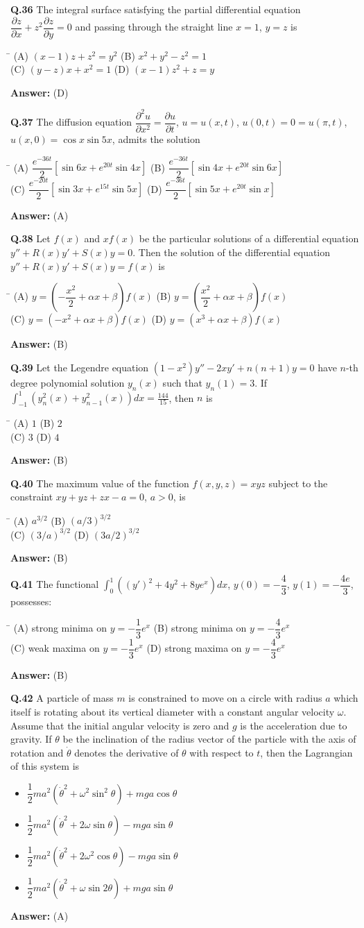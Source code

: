 \documentclass[11pt,a4paper]{article}
\newcommand{\optsfourA}[4]{%
  \begin{tabbing}
    \hspace{0.48\linewidth}\=\kill
    (A) #1 \> (B) #2 \\[2pt]
    (C) #3 \> (D) #4
  \end{tabbing}%
}
\newcommand{\optslistA}[4]{%
  \begin{itemize}
    \setlength{\itemsep}{2pt}\setlength{\parskip}{0pt}
    \item[(A)] #1
    \item[(B)] #2
    \item[(C)] #3
    \item[(D)] #4
  \end{itemize}%
}
\newcommand{\ans}[1]{\textbf{Answer:} #1\par\medskip}
\begin{document}
\textbf{Q.36} The integral surface satisfying the partial differential equation $\dfrac{\partial z}{\partial x} + z^2\dfrac{\partial z}{\partial y} = 0$ and passing through the straight line $x = 1$, $y = z$ is
\optsfourA{$(x - 1)z + z^2 = y^2$}{$x^2 + y^2 - z^2 = 1$}{$(y - z)x + x^2 = 1$}{$(x - 1)z^2 + z = y$}
\ans{(D)}

\textbf{Q.37} The diffusion equation $\dfrac{\partial^2 u}{\partial x^2} = \dfrac{\partial u}{\partial t}$, $u = u(x, t)$, $u(0, t) = 0 = u(\pi, t)$, $u(x, 0) = \cos x \sin 5x$, admits the solution
\optsfourA{$\dfrac{e^{-36t}}{2}[\sin 6x + e^{20t}\sin 4x]$}{$\dfrac{e^{-36t}}{2}[\sin 4x + e^{20t}\sin 6x]$}{$\dfrac{e^{-20t}}{2}[\sin 3x + e^{15t}\sin 5x]$}{$\dfrac{e^{-36t}}{2}[\sin 5x + e^{20t}\sin x]$}
\ans{(A)}

\textbf{Q.38} Let $f(x)$ and $x f(x)$ be the particular solutions of a differential equation $y'' + R(x)y' + S(x)y = 0$. Then the solution of the differential equation $y'' + R(x)y' + S(x)y = f(x)$ is
\optsfourA{$y = \left(-\dfrac{x^2}{2} + \alpha x + \beta\right)f(x)$}{$y = \left(\dfrac{x^2}{2} + \alpha x + \beta\right)f(x)$}{$y = (-x^2 + \alpha x + \beta)f(x)$}{$y = (x^3 + \alpha x + \beta)f(x)$}
\ans{(B)}

\textbf{Q.39} Let the Legendre equation $(1 - x^2)y'' - 2xy' + n(n + 1)y = 0$ have $n$-th degree polynomial solution $y_n(x)$ such that $y_n(1) = 3$. If $\displaystyle\int_{-1}^{1} \left(y_n^2(x) + y_{n-1}^2(x)\right)dx = \frac{144}{15}$, then $n$ is
\optsfourA{$1$}{$2$}{$3$}{$4$}
\ans{(B)}

\textbf{Q.40} The maximum value of the function $f(x, y, z) = xyz$ subject to the constraint $xy + yz + zx - a = 0$, $a > 0$, is
\optsfourA{$a^{3/2}$}{$(a/3)^{3/2}$}{$(3/a)^{3/2}$}{$(3a/2)^{3/2}$}
\ans{(B)}

\textbf{Q.41} The functional $\displaystyle\int_0^1 \left((y')^2 + 4y^2 + 8y e^x\right)dx$, $y(0) = -\dfrac{4}{3}$, $y(1) = -\dfrac{4e}{3}$, possesses:
\optsfourA{strong minima on $y = -\dfrac{1}{3}e^x$}{strong minima on $y = -\dfrac{4}{3}e^x$}{weak maxima on $y = -\dfrac{1}{3}e^x$}{strong maxima on $y = -\dfrac{4}{3}e^x$}
\ans{(B)}

\textbf{Q.42} A particle of mass $m$ is constrained to move on a circle with radius $a$ which itself is rotating about its vertical diameter with a constant angular velocity $\omega$. Assume that the initial angular velocity is zero and $g$ is the acceleration due to gravity. If $\theta$ be the inclination of the radius vector of the particle with the axis of rotation and $\dot{\theta}$ denotes the derivative of $\theta$ with respect to $t$, then the Lagrangian of this system is
\optslistA{$\dfrac{1}{2}ma^2(\dot{\theta}^2 + \omega^2\sin^2\theta) + mga\cos\theta$}{$\dfrac{1}{2}ma^2(\dot{\theta}^2 + 2\omega\sin\theta) - mga\sin\theta$}{$\dfrac{1}{2}ma^2(\dot{\theta}^2 + 2\omega^2\cos\theta) - mga\sin\theta$}{$\dfrac{1}{2}ma^2(\dot{\theta}^2 + \omega\sin 2\theta) + mga\sin\theta$}
\ans{(A)}
\end{document}
